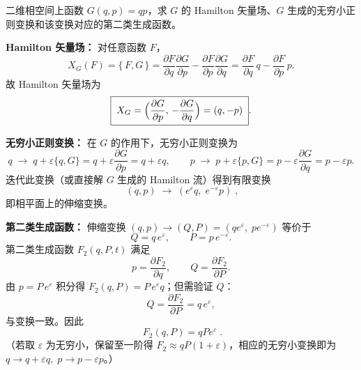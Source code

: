 \begin{question}
二维相空间上函数 \(G(q,p)=qp\)，求 \(G\) 的 Hamilton 矢量场、\(G\) 生成的无穷小正则变换和该变换对应的第二类生成函数。
\begin{solution}
\noindent\textbf{Hamilton 矢量场：} 对任意函数 \(F\)，
\[
X_G(F)=\{\,F,G\,\}
=\frac{\partial F}{\partial q}\frac{\partial G}{\partial p}
-\frac{\partial F}{\partial p}\frac{\partial G}{\partial q}
=\frac{\partial F}{\partial q}\,q-\frac{\partial F}{\partial p}\,p .
\]
故 Hamilton 矢量场为
\[
\boxed{\;X_G=\Bigl(\frac{\partial G}{\partial p},\,-\frac{\partial G}{\partial q}\Bigr)=(q,-p)\;}.
\]

\noindent\textbf{无穷小正则变换：} 在 \(G\) 的作用下，无穷小正则变换为
\[
q\;\longrightarrow\; q+\varepsilon\{q,G\}=q+\varepsilon\frac{\partial G}{\partial p}=q+\varepsilon q,
\qquad
p\;\longrightarrow\; p+\varepsilon\{p,G\}=p-\varepsilon\frac{\partial G}{\partial q}=p-\varepsilon p .
\]
迭代此变换（或直接解 \(G\) 生成的 Hamilton 流）得到有限变换
\[
\boxed{\;(q,p)\;\longrightarrow\;(e^{\varepsilon}q,\;e^{-\varepsilon}p)\;},
\]
即相平面上的伸缩变换。

\noindent\textbf{第二类生成函数：} 伸缩变换 \((q,p)\to(Q,P)=(q e^\varepsilon,\;p e^{-\varepsilon})\) 等价于
\[
Q=q\,e^{\varepsilon},\qquad P=p\,e^{-\varepsilon}.
\]
第二类生成函数 \(F_2(q,P,t)\) 满足
\[
p=\frac{\partial F_2}{\partial q},\qquad Q=\frac{\partial F_2}{\partial P}.
\]
由 \(p=P\,e^{\varepsilon}\) 积分得 \(F_2(q,P)=P\,e^{\varepsilon}q\)；但需验证 \(Q\)：
\[
Q=\frac{\partial F_2}{\partial P}=q\,e^{\varepsilon},
\]
与变换一致。因此
\[
\boxed{\;F_2(q,P)=qP e^{\varepsilon}\;}.
\]
（若取 \(\varepsilon\) 为无穷小，保留至一阶得 \(F_2\approx qP(1+\varepsilon)\)，相应的无穷小变换即为 \(q\to q+\varepsilon q,\;p\to p-\varepsilon p\)。）
\end{solution}
\end{question}

